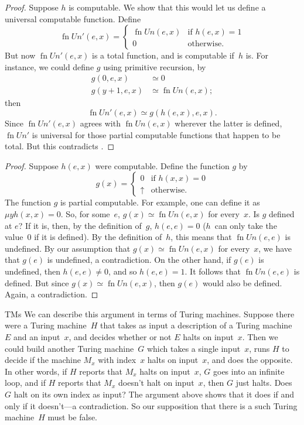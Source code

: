 \documentclass[10pt,a4paper]{article}
\makeatletter
\theoremstyle{plain}
\theoremstyle{definition}
\theoremstyle{remark}
\newenvironment{explain}{}{}
\newcommand{\olref}{\@ifnextchar[{\olref@i}{\olref@final}}
\def\olref@i[#1]{\@ifnextchar[{\olref@ii}{\olref@final}}
\def\olref@ii[#1]{\@ifnextchar[{\olref@iii}{\olref@final}}
\def\olref@iii[#1]{\olref@final}
\def\olref@final#1{\ref{#1}}
\providecommand{\umin}{\mu}
\providecommand{\fundefined}{\mathord{\uparrow}}
\providecommand{\fn}{\operatorname{fn}}
\makeatother
\begin{document}
\begin{proof}
Suppose $h$ is computable. We show that this would let us define a
universal computable function. Define
\[
\fn{Un'}(e,x) =
\begin{cases}
\fn{Un}(e,x) & \text{if $h(e,x) = 1$} \\
0 & \text{otherwise.}
\end{cases}
\]
But now $\fn{Un'}(e, x)$ is a total function, and is computable if~$h$
is. For instance, we could define $g$ using primitive recursion, by
\begin{align*}
g(0, e, x) & \simeq 0 \\
g(y+1, e, x) & \simeq \fn{Un}(e,x);
\end{align*}
then
\[
\fn{Un'}(e,x) \simeq g(h(e,x),e,x).
\]
Since $\fn{Un'}(e,x)$ agrees with $\fn{Un}(e,x)$ wherever the latter
is defined, $\fn{Un'}$ is universal for those partial computable
functions that happen to be total. But this contradicts
\olref[nou]{thm:no-univ}.
\end{proof}

\begin{proof}
Suppose $h(e,x)$ were computable. Define the function $g$ by
\[
g(x) =
\begin{cases}
  0                & \text{if $h(x,x) = 0$} \\
  \fundefined & \text{otherwise.}
\end{cases}
\]
The function $g$ is partial computable. For example, one can define it
as $\umin{y}{h(x,x) = 0}$. So, for some~$e$, $g(x) \simeq \fn{Un}(e,
x)$ for every~$x$. Is $g$ defined at $e$?  If it is, then, by the
definition of~$g$, $h(e,e) = 0$ ($h$~can only take the value~$0$ if it
is defined). By the definition of~$h$, this means that $\fn{Un}(e, e)$
is undefined. By our assumption that $g(x) \simeq \fn{Un}(e, x)$
for every~$x$, we have that $g(e)$ is undefined, a contradiction.
On the other hand, if $g(e)$ is undefined, then $h(e,e) \neq 0$, and
so $h(e,e) = 1$. It follows that $\fn{Un}(e, e)$ is defined. But since
$g(x) \simeq \fn{Un}(e, x)$, then $g(e)$ would also be defined. Again,
a contradiction.
\end{proof}

\begin{tagblock}{TMs}
\begin{explain}
We can describe this argument in terms of Turing machines.  Suppose
there were a Turing machine~$H$ that takes as input a description of a
Turing machine~$E$ and an input~$x$, and decides whether or not $E$
halts on input~$x$. Then we could build another Turing machine~$G$
which takes a single input~$x$, runs $H$ to decide if the machine
$M_x$ with index~$x$ halts on input~$x$, and does the opposite. In
other words, if $H$ reports that $M_x$ halts on input~$x$, $G$ goes
into an infinite loop, and if $H$ reports that $M_x$ doesn't halt on
input~$x$, then $G$ just halts. Does $G$ halt on its own index as
input? The argument above shows that it does if and only if it
doesn't---a contradiction. So our supposition that there is a such
Turing machine~$H$ must be false.
\end{explain}
\end{tagblock}
\end{document}
